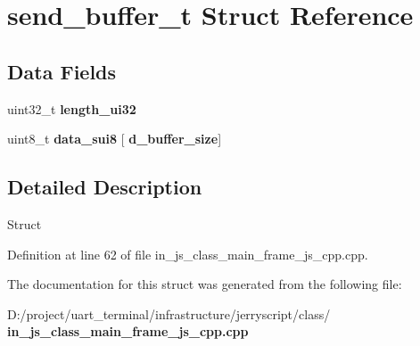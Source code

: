 \section{send\+\_\+buffer\+\_\+t Struct Reference}
\label{structsend__buffer__t}
\subsection*{Data Fields}
\begin{DoxyCompactItemize}
\item 
\mbox{\label{structsend__buffer__t_a6c8efdcf733469856a7b78a0af80ea9a}} 
uint32\+\_\+t {\bfseries length\+\_\+ui32}
\item 
\mbox{\label{structsend__buffer__t_ace95aee10e6a2bb5a3aff40c04b300fe}} 
uint8\+\_\+t {\bfseries data\+\_\+sui8} [\textbf{ d\+\_\+buffer\+\_\+size}]
\end{DoxyCompactItemize}


\subsection{Detailed Description}
Struct 

Definition at line 62 of file in\+\_\+js\+\_\+class\+\_\+main\+\_\+frame\+\_\+js\+\_\+cpp.\+cpp.



The documentation for this struct was generated from the following file\+:\begin{DoxyCompactItemize}
\item 
D\+:/project/uart\+\_\+terminal/infrastructure/jerryscript/class/\textbf{ in\+\_\+js\+\_\+class\+\_\+main\+\_\+frame\+\_\+js\+\_\+cpp.\+cpp}\end{DoxyCompactItemize}
